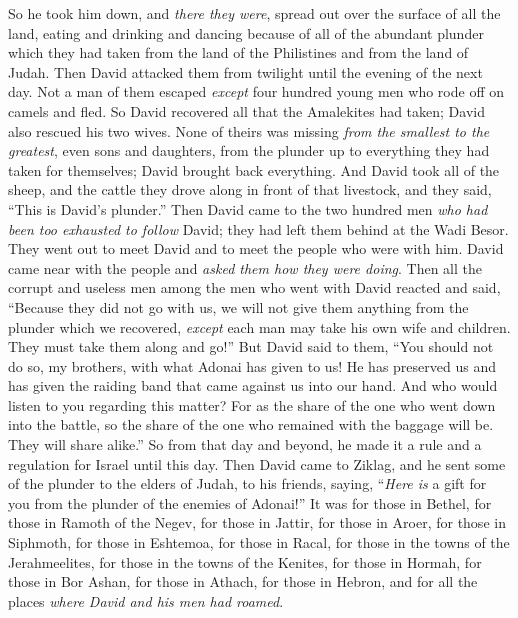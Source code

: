\begin{biblechapter}
\verse So he took him down, and \textit{there they were}, spread out over the surface of all the land, eating and drinking and dancing because of all of the abundant plunder which they had taken from the land of the Philistines and from the land of Judah.
\verse Then David attacked them from twilight until the evening of the next day. Not a man of them escaped \textit{except} four hundred young men who rode off on camels and fled.
\verse So David recovered all that the Amalekites had taken; David also rescued his two wives.
\verse None of theirs was missing \textit{from the smallest to the greatest}, even sons and daughters, from the plunder up to everything they had taken for themselves; David brought back everything.
\verse And David took all of the sheep, and the cattle they drove along in front of that livestock, and they said, “This is David’s plunder.”
\verse Then David came to the two hundred men \textit{who had been too exhausted to follow} David; they had left them behind at the Wadi Besor. They went out to meet David and to meet the people who were with him. David came near with the people and \textit{asked them how they were doing}.
\verse Then all the corrupt and useless men among the men who went with David reacted and said, “Because they did not go with us, we will not give them anything from the plunder which we recovered, \textit{except} each man may take his own wife and children. They must take them along and go!”
\verse But David said to them, “You should not do so, my brothers, with what Adonai has given to us! He has preserved us and has given the raiding band that came against us into our hand.
\verse And who would listen to you regarding this matter? For as the share of the one who went down into the battle, so the share of the one who remained with the baggage will be. They will share alike.”
\verse So from that day and beyond, he made it a rule and a regulation for Israel until this day.
\verse Then David came to Ziklag, and he sent some of the plunder to the elders of Judah, to his friends, saying, “\textit{Here is} a gift for you from the plunder of the enemies of Adonai!”
\verse It was for those in Bethel, for those in Ramoth of the Negev, for those in Jattir,
\verse for those in Aroer, for those in Siphmoth, for those in Eshtemoa,
\verse for those in Racal, for those in the towns of the Jerahmeelites, for those in the towns of the Kenites,
\verse for those in Hormah, for those in Bor Ashan, for those in Athach,
\verse for those in Hebron, and for all the places \textit{where David and his men had roamed}.
\end{biblechapter}

